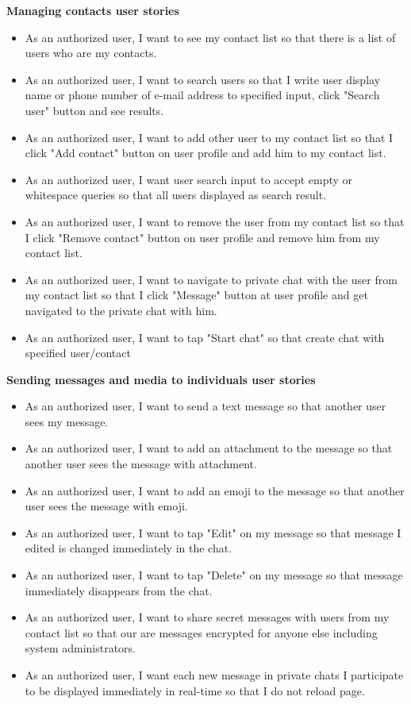 \textbf{Managing contacts user stories}
\begin{itemize}
    \item As an authorized user, I want to see my contact list so that there is a list of users who are my contacts.
    \item As an authorized user, I want to search users so that I write user display name or phone number of e-mail
    address to specified input, click "Search user" button and see results.
    \item As an authorized user, I want to add other user to my contact list so that I click "Add contact" button on
    user profile and add him to my contact list.
    \item As an authorized user, I want user search input to accept empty or whitespace queries so that all users
    displayed as search result.
    \item As an authorized user, I want to remove the user from my contact list so that I click "Remove contact" button
    on user profile and remove him from my contact list.
    \item As an authorized user, I want to navigate to private chat with the user from my contact list so that I click
    "Message" button at user profile and get navigated to the private chat with him.
    \item As an authorized user, I want to tap "Start chat" so that create chat with specified user/contact
\end{itemize}

\textbf{Sending messages and media to individuals user stories}
\begin{itemize}
    \item As an authorized user, I want to send a text message so that another user sees my message.
    \item As an authorized user, I want to add an attachment to the message so that another user sees the message with attachment.
    \item As an authorized user, I want to add an emoji to the message so that another user sees the message with emoji.
    \item As an authorized user, I want to tap "Edit" on my message so that message I edited is changed immediately in the chat.
    \item As an authorized user, I want to tap "Delete" on my message so that message immediately disappears from the chat.
    \item As an authorized user, I want to share secret messages with users from my contact list so that our are
    messages encrypted for anyone else including system administrators.
    \item As an authorized user, I want each new message in private chats I participate to be displayed immediately
    in real-time so that I do not reload page.
\end{itemize}

